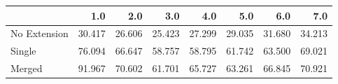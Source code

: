 \begin{tabular}{lrrrrrrr}
\toprule
{} &    1.0 &    2.0 &    3.0 &    4.0 &    5.0 &    6.0 &    7.0 \\
\midrule
No Extension & 30.417 & 26.606 & 25.423 & 27.299 & 29.035 & 31.680 & 34.213 \\
Single       & 76.094 & 66.647 & 58.757 & 58.795 & 61.742 & 63.500 & 69.021 \\
Merged       & 91.967 & 70.602 & 61.701 & 65.727 & 63.261 & 66.845 & 70.921 \\
\bottomrule
\end{tabular}

